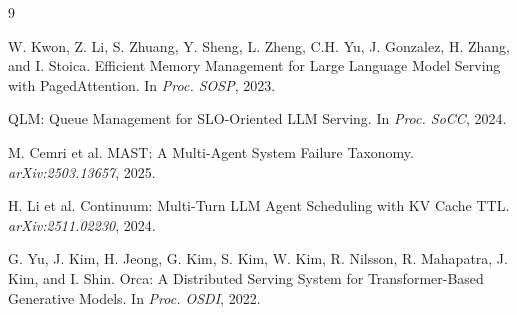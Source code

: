 \documentclass[10pt, twocolumn, letterpaper]{article}
\begin{document}
\begingroup
\renewcommand{\section}[2]{}
\begin{thebibliography}{9}

W. Kwon, Z. Li, S. Zhuang, Y. Sheng, L. Zheng, C.H. Yu, J. Gonzalez, H. Zhang, and I. Stoica.
\newblock Efficient Memory Management for Large Language Model Serving with PagedAttention.
\newblock In \textit{Proc. SOSP}, 2023.

QLM: Queue Management for SLO-Oriented LLM Serving.
\newblock In \textit{Proc. SoCC}, 2024.

M. Cemri et al.
\newblock MAST: A Multi-Agent System Failure Taxonomy.
\newblock \textit{arXiv:2503.13657}, 2025.

H. Li et al.
\newblock Continuum: Multi-Turn LLM Agent Scheduling with KV Cache TTL.
\newblock \textit{arXiv:2511.02230}, 2024.

G. Yu, J. Kim, H. Jeong, G. Kim, S. Kim, W. Kim, R. Nilsson, R. Mahapatra, J. Kim, and I. Shin.
\newblock Orca: A Distributed Serving System for Transformer-Based Generative Models.
\newblock In \textit{Proc. OSDI}, 2022.

\end{thebibliography}
\endgroup
\end{document}
